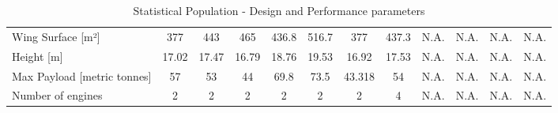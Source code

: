 \documentclass{article}
\begin{document}
\begin{landscape}
\begin{table}[]
{\begin{tabular}{@{}lccccccccccc@{}}
    \rowcolor[HTML]{EFEFEF} 
    \cellcolor[HTML]{FFEF98}Wing Surface {[}m²{]}           & 377   & 443   & 465   & 436.8 & 516.7 & 377    & 437.3 & N.A.  & N.A.  & N.A. & N.A. \\
    \cellcolor[HTML]{FCF1B3}Height {[}m{]}                  & 17.02 & 17.47 & 16.79 & 18.76 & 19.53 & 16.92  & 17.53 & N.A.  & N.A.  & N.A. & N.A. \\
    \rowcolor[HTML]{EFEFEF} 
    \cellcolor[HTML]{FFEF98}Max Payload {[}metric tonnes{]} & 57    & 53    & 44    & 69.8  & 73.5  & 43.318 & 54    & N.A.  & N.A.  & N.A. & N.A. \\
    \cellcolor[HTML]{FCF1B3}Number of engines               & 2     & 2     & 2     & 2     & 2     & 2      & 4     & N.A.  & N.A.  & N.A. & N.A.
    \end{tabular}%
    }
    \caption{Statistical Population - Design and Performance parameters}
    \label{tab:stat_pop_des_perf}
    \end{table}
\end{landscape}

    \clearpage
    \newpage
\end{document}
